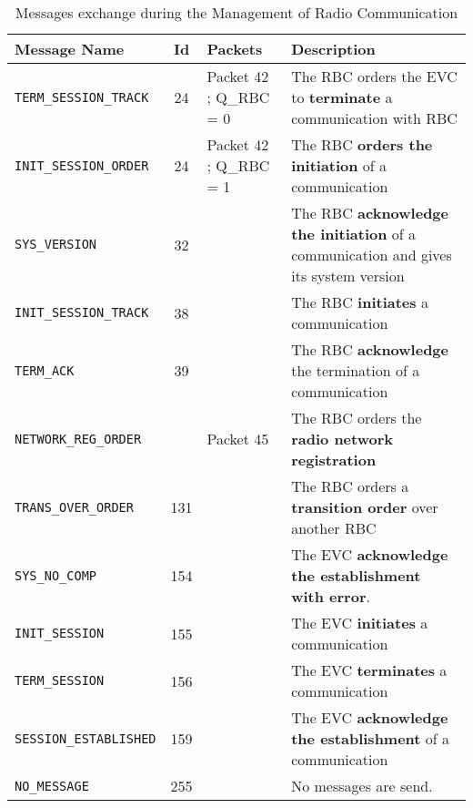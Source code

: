 \begin{table}
  \caption{\label{table:Messages} Messages exchange during the Management of
  Radio Communication}
  \begin{tabular}{lclp{}}\toprule
  Message Name & Id & Packets& Description \\\midrule
  \verb+TERM_SESSION_TRACK+& 24 & Packet 42 ; Q\_RBC = 0& The RBC orders the EVC to {\bf terminate} a communication with RBC \\
   \verb+INIT_SESSION_ORDER+ & 24 &Packet 42 ; Q\_RBC = 1 & 
   The RBC {\bf orders the initiation} of a communication \\
  \verb+SYS_VERSION+ & 32 & & The RBC {\bf acknowledge the initiation} of a
  communication and gives its system version \\
  \verb+INIT_SESSION_TRACK+ & 38 & &  The RBC {\bf initiates} a communication \\
  \verb+TERM_ACK+ & 39 & &  The RBC {\bf acknowledge} the termination
  of a communication \\
  \verb+NETWORK_REG_ORDER+ &  & Packet 45 & The RBC orders the {\bf
    radio network registration}\\    
  \verb+TRANS_OVER_ORDER+ & 131 & & The RBC orders a {\bf transition order} over another RBC \\
  \verb+SYS_NO_COMP+ & 154 &&The EVC {\bf acknowledge the establishment with error}. \\
  \verb+INIT_SESSION+& 155 &&  The EVC {\bf initiates} a communication \\
  \verb+TERM_SESSION+ & 156&&The EVC {\bf terminates} a communication  \\
  \verb+SESSION_ESTABLISHED+ & 159 & & The EVC {\bf acknowledge the establishment} of a communication \\
  \verb+NO_MESSAGE+ & 255 & & No messages are send. \\
  \bottomrule
  \end{tabular}
\end{table}
